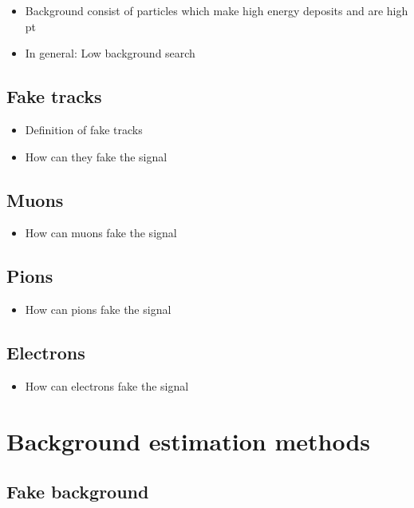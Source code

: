 \begin{itemize}
\item Background consist of particles which make high energy deposits and are high pt
\item In general: Low background search
\end{itemize}
\subsection{Fake tracks}
\begin{itemize}
\item Definition of fake tracks
\item How can they fake the signal
\end{itemize}
\subsection{Muons}
\begin{itemize}
\item How can muons fake the signal
\end{itemize}
\subsection{Pions}
\begin{itemize}
\item How can pions fake the signal
\end{itemize}
\subsection{Electrons}
\begin{itemize}
\item How can electrons fake the signal
\end{itemize}
\section{Background estimation methods}
\label{sec:BackgroundEstimation}
\subsection{Fake background}
